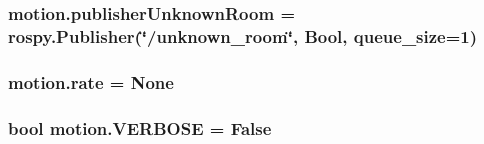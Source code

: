\subsubsection[{\texorpdfstring{publisher\+Unknown\+Room}{publisherUnknownRoom}}]{\setlength{\rightskip}{0pt plus 5cm}motion.\+publisher\+Unknown\+Room = rospy.\+Publisher(\char`\"{}/unknown\+\_\+room\char`\"{}, Bool, queue\+\_\+size=1)}\hypertarget{namespacemotion_ac08467b50a1ebb7e985d8b93bcf5653d}{}\label{namespacemotion_ac08467b50a1ebb7e985d8b93bcf5653d}
\subsubsection[{\texorpdfstring{rate}{rate}}]{\setlength{\rightskip}{0pt plus 5cm}motion.\+rate = None}\hypertarget{namespacemotion_a86619454560e5d6f8dfe5dd042391ca1}{}\label{namespacemotion_a86619454560e5d6f8dfe5dd042391ca1}
\subsubsection[{\texorpdfstring{V\+E\+R\+B\+O\+SE}{VERBOSE}}]{\setlength{\rightskip}{0pt plus 5cm}bool motion.\+V\+E\+R\+B\+O\+SE = False}\hypertarget{namespacemotion_a9f9cd0f38a0aad33b5304b4edef120cd}{}\label{namespacemotion_a9f9cd0f38a0aad33b5304b4edef120cd}
